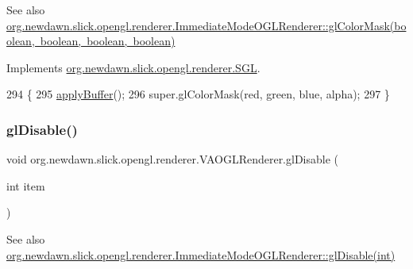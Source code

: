 \begin{DoxySeeAlso}{See also}
\mbox{\hyperlink{classorg_1_1newdawn_1_1slick_1_1opengl_1_1renderer_1_1_immediate_mode_o_g_l_renderer_a451ffce8749614d627ef560ed3988b18}{org.\+newdawn.\+slick.\+opengl.\+renderer.\+Immediate\+Mode\+O\+G\+L\+Renderer\+::gl\+Color\+Mask(boolean, boolean, boolean, boolean)}} 
\end{DoxySeeAlso}


Implements \mbox{\hyperlink{interfaceorg_1_1newdawn_1_1slick_1_1opengl_1_1renderer_1_1_s_g_l_a35f9b484d84c168623bc7236152f2d50}{org.\+newdawn.\+slick.\+opengl.\+renderer.\+S\+GL}}.


\begin{DoxyCode}
294                                                                                      \{
295         \mbox{\hyperlink{classorg_1_1newdawn_1_1slick_1_1opengl_1_1renderer_1_1_v_a_o_g_l_renderer_a7c5d09419cd40761be8f849631aebab5}{applyBuffer}}();
296         super.glColorMask(red, green, blue, alpha);
297     \}
\end{DoxyCode}
\mbox{\label{classorg_1_1newdawn_1_1slick_1_1opengl_1_1renderer_1_1_v_a_o_g_l_renderer_ad79f25ad984dc8c504495c628aaadb4e}} 
\subsubsection{\texorpdfstring{gl\+Disable()}{glDisable()}}
{\footnotesize\ttfamily void org.\+newdawn.\+slick.\+opengl.\+renderer.\+V\+A\+O\+G\+L\+Renderer.\+gl\+Disable (\begin{DoxyParamCaption}\item[{int}]{item }\end{DoxyParamCaption})\hspace{0.3cm}{\ttfamily [inline]}}

\begin{DoxySeeAlso}{See also}
\mbox{\hyperlink{classorg_1_1newdawn_1_1slick_1_1opengl_1_1renderer_1_1_immediate_mode_o_g_l_renderer_a98084664d41997626872ebedb5d76474}{org.\+newdawn.\+slick.\+opengl.\+renderer.\+Immediate\+Mode\+O\+G\+L\+Renderer\+::gl\+Disable(int)}} 
\end{DoxySeeAlso}


